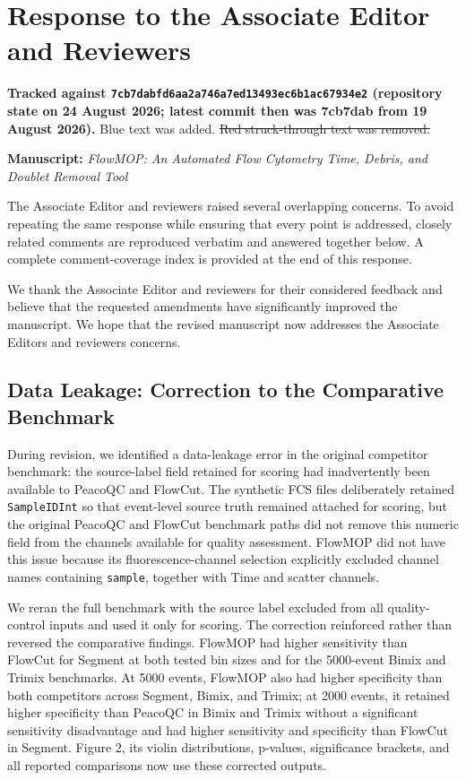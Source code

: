 \documentclass[
  11pt,
  a4paper,
]{article}
\author{}
\date{}
\begin{document}
\section{Response to the Associate Editor and
Reviewers}\label{response-to-the-associate-editor-and-reviewers}

\textbf{Tracked against
\texttt{7cb7dabfd6aa2a746a7ed13493ec6b1ac67934e2} (repository state on
24 August 2026; latest commit then was 7cb7dab from 19 August 2026).}
{\color{revisionblue}Blue text was added.} {\color{revisionred}\sout{Red
struck-through text was removed.}}

\textbf{Manuscript:} \emph{FlowMOP: An Automated Flow Cytometry Time,
Debris, and Doublet Removal Tool}

The Associate Editor and reviewers raised several overlapping concerns.
To avoid repeating the same response while ensuring that every point is
addressed, closely related comments are reproduced verbatim and answered
together below. A complete comment-coverage index is provided at the end
of this response.

We thank the Associate Editor and reviewers for their considered
feedback and believe that the requested amendments have significantly
improved the manuscript. We hope that the revised manuscript now
addresses the Associate Editor\textquotesingle s and
reviewers\textquotesingle{} concerns.

\subsection{Data Leakage: Correction to the Comparative
Benchmark}\label{data-leakage-correction-to-the-comparative-benchmark}

During revision, we identified a data-leakage error in the original
competitor benchmark: the source-label field retained for scoring had
inadvertently been available to PeacoQC and FlowCut. The synthetic FCS
files deliberately retained \texttt{SampleIDInt} so that event-level
source truth remained attached for scoring, but the original PeacoQC and
FlowCut benchmark paths did not remove this numeric field from the
channels available for quality assessment. FlowMOP did not have this
issue because its fluorescence-channel selection explicitly excluded
channel names containing \texttt{sample}, together with Time and scatter
channels.

We reran the full benchmark with the source label excluded from all
quality-control inputs and used it only for scoring. The correction
reinforced rather than reversed the comparative findings. FlowMOP had
higher sensitivity than FlowCut for Segment at both tested bin sizes and
for the 5000-event Bimix and Trimix benchmarks. At 5000 events, FlowMOP
also had higher specificity than both competitors across Segment, Bimix,
and Trimix; at 2000 events, it retained higher specificity than PeacoQC
in Bimix and Trimix without a significant sensitivity disadvantage and
had higher sensitivity and specificity than FlowCut in Segment. Figure
2, its violin distributions, p-values, significance brackets, and all
reported comparisons now use these corrected outputs.
\end{document}
